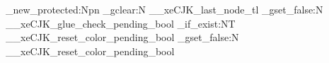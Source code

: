 %
\usepackage{array}
\usepackage{xcolor}

\pagestyle{empty}
\setlength{\parindent}{0pt}
\setlength{\fboxsep}{2pt}
\renewcommand\arraystretch{1.35}


\newbox\MatrixCandidate
\newbox\MatrixOracle
\newbox\MatrixCandidateContext
\newbox\MatrixOracleContext
\newdimen\MatrixIntrinsicDelta
\newdimen\MatrixDelta
\newdimen\MatrixAbsDelta

\ExplSyntaxOn
\cs_new_protected:Npn \MatrixReset
  {
    \tl_gclear:N \g__xeCJK_last_node_tl
    \bool_gset_false:N \g__xeCJK_glue_check_pending_bool
    \bool_if_exist:NT \g__xeCJK_reset_color_pending_bool
      { \bool_gset_false:N \g__xeCJK_reset_color_pending_bool }
  }
\ExplSyntaxOff

\newcommand\MatrixVariant[3]{%
  \MatrixReset\global\setbox\MatrixCandidateContext=\hbox{#2}%
  \MatrixReset\global\setbox\MatrixOracleContext=\hbox{#3}%
  \global\MatrixDelta=\dimexpr
    \wd\MatrixCandidateContext-\wd\MatrixOracleContext-
    \MatrixIntrinsicDelta\relax
  \global\MatrixAbsDelta=\MatrixDelta
  \ifdim\MatrixAbsDelta<0pt \global\MatrixAbsDelta=-\MatrixAbsDelta\fi
  \texttt{#1}&
  \fbox{\copy\MatrixOracleContext}&
  \fbox{\copy\MatrixCandidateContext}&
  \ifdim\MatrixAbsDelta<0.01pt
    \textcolor{teal!70!black}{same}%
  \else
    \textcolor{red!80!black}{\the\MatrixDelta}%
  \fi
  \tabularnewline
}

\newcommand\Matrix[5]{%
  \multicolumn{4}{@{}l}{%
    \MatrixReset\global\setbox\MatrixCandidate=\hbox{#3}%
    \MatrixReset\global\setbox\MatrixOracle=\hbox{#4}%
    \global\MatrixIntrinsicDelta=\dimexpr
      \wd\MatrixCandidate-\wd\MatrixOracle\relax
    \rule{0pt}{14pt}\bfseries #1}\tabularnewline
  \MatrixVariant{00}{#2#3#5}{#2#4#5}%
  \MatrixVariant{10}{#2 #3#5}{#2 #4#5}%
  \MatrixVariant{01}{#2#3 #5}{#2#4 #5}%
  \MatrixVariant{11}{#2 #3 #5}{#2 #4 #5}%
}

